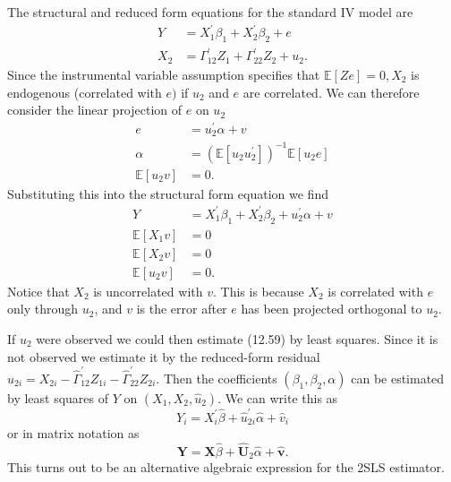 \documentclass[10pt]{article}
\begin{document}
The structural and reduced form equations for the standard IV model are
$$
\begin{aligned}
Y &=X_{1}^{\prime} \beta_{1}+X_{2}^{\prime} \beta_{2}+e \\
X_{2} &=\Gamma_{12}^{\prime} Z_{1}+\Gamma_{22}^{\prime} Z_{2}+u_{2} .
\end{aligned}
$$
Since the instrumental variable assumption specifies that $\mathbb{E}[Z e]=0, X_{2}$ is endogenous (correlated with $e)$ if $u_{2}$ and $e$ are correlated. We can therefore consider the linear projection of $e$ on $u_{2}$
$$
\begin{aligned}
e &=u_{2}^{\prime} \alpha+v \\
\alpha &=\left(\mathbb{E}\left[u_{2} u_{2}^{\prime}\right]\right)^{-1} \mathbb{E}\left[u_{2} e\right] \\
\mathbb{E}\left[u_{2} v\right] &=0 .
\end{aligned}
$$
Substituting this into the structural form equation we find
$$
\begin{aligned}
Y &=X_{1}^{\prime} \beta_{1}+X_{2}^{\prime} \beta_{2}+u_{2}^{\prime} \alpha+v \\
\mathbb{E}\left[X_{1} v\right] &=0 \\
\mathbb{E}\left[X_{2} v\right] &=0 \\
\mathbb{E}\left[u_{2} v\right] &=0 .
\end{aligned}
$$
Notice that $X_{2}$ is uncorrelated with $v$. This is because $X_{2}$ is correlated with $e$ only through $u_{2}$, and $v$ is the error after $e$ has been projected orthogonal to $u_{2}$.

If $u_{2}$ were observed we could then estimate (12.59) by least squares. Since it is not observed we estimate it by the reduced-form residual $\widehat{u}_{2 i}=X_{2 i}-\widehat{\Gamma}_{12}^{\prime} Z_{1 i}-\widehat{\Gamma}_{22}^{\prime} Z_{2 i}$. Then the coefficients $\left(\beta_{1}, \beta_{2}, \alpha\right)$ can be estimated by least squares of $Y$ on $\left(X_{1}, X_{2}, \widehat{u}_{2}\right)$. We can write this as
$$
Y_{i}=X_{i}^{\prime} \widehat{\beta}+\widehat{u}_{2 i}^{\prime} \widehat{\alpha}+\widehat{v}_{i}
$$
or in matrix notation as
$$
\boldsymbol{Y}=\boldsymbol{X} \widehat{\beta}+\widehat{\boldsymbol{U}}_{2} \widehat{\alpha}+\widehat{\boldsymbol{v}} .
$$
This turns out to be an alternative algebraic expression for the 2SLS estimator.
\end{document}
